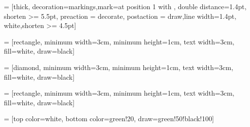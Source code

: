 \documentclass[twoside]{linux_thesis}
\begin{document}
\newcommand{\shell}[1]{\noindent\texttt{\$: #1}}




%

\tableofcontents



% 

\usetikzlibrary{shapes.geometric, arrows, decorations.markings}

 = [thick, decoration={markings,mark=at position
   1 with {}},
   double distance=1.4pt, shorten >= 5.5pt,
   preaction = {decorate},
   postaction = {draw,line width=1.4pt, white,shorten >= 4.5pt}]

 = [rectangle, minimum width=3cm, minimum height=1cm,
                      text width=3cm,
                      fill=white,
                      draw=black]
                      
 = [diamond, minimum width=3cm, minimum height=1cm,
                      text width=3cm,
                      fill=white,
                      draw=black]

 = [rectangle, minimum width=3cm, minimum height=1cm,
                      text width=3cm,
                      fill=white,
                      draw=black]
                      

 = [top color=white, bottom color=green!20, 
                         draw=green!50!black!100]
\end{document}
